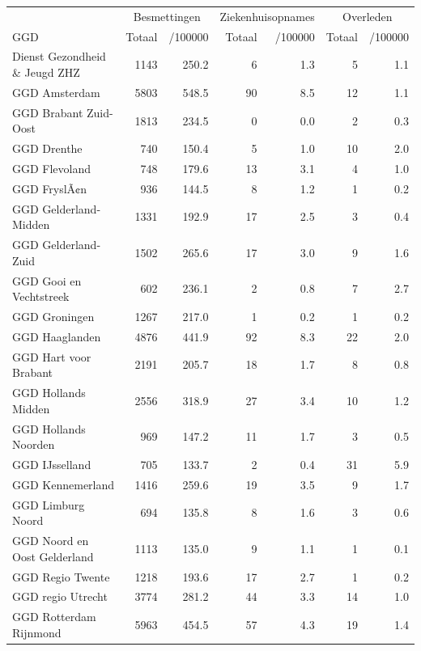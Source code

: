 \documentclass[
  english,
  man,floatsintext]{apa6}
\begin{document}
\begin{table}[H]
\centering\begingroup\fontsize{10}{12}\selectfont

\begin{threeparttable}
\begin{tabular}{lrrrrrr}
\toprule
\multicolumn{1}{c}{ } & \multicolumn{2}{c}{Besmettingen} & \multicolumn{2}{c}{Ziekenhuisopnames} & \multicolumn{2}{c}{Overleden} \\
\cmidrule(l{3pt}r{3pt}){2-3} \cmidrule(l{3pt}r{3pt}){4-5} \cmidrule(l{3pt}r{3pt}){6-7}
GGD & Totaal & /100000 & Totaal & /100000 & Totaal & /100000\\
\midrule
Dienst Gezondheid \& Jeugd ZHZ & 1143 & 250.2 & 6 & 1.3 & 5 & 1.1\\
GGD Amsterdam & 5803 & 548.5 & 90 & 8.5 & 12 & 1.1\\
GGD Brabant Zuid-Oost & 1813 & 234.5 & 0 & 0.0 & 2 & 0.3\\
GGD Drenthe & 740 & 150.4 & 5 & 1.0 & 10 & 2.0\\
GGD Flevoland & 748 & 179.6 & 13 & 3.1 & 4 & 1.0\\
GGD FryslÃ¢n & 936 & 144.5 & 8 & 1.2 & 1 & 0.2\\
GGD Gelderland-Midden & 1331 & 192.9 & 17 & 2.5 & 3 & 0.4\\
GGD Gelderland-Zuid & 1502 & 265.6 & 17 & 3.0 & 9 & 1.6\\
GGD Gooi en Vechtstreek & 602 & 236.1 & 2 & 0.8 & 7 & 2.7\\
GGD Groningen & 1267 & 217.0 & 1 & 0.2 & 1 & 0.2\\
GGD Haaglanden & 4876 & 441.9 & 92 & 8.3 & 22 & 2.0\\
GGD Hart voor Brabant & 2191 & 205.7 & 18 & 1.7 & 8 & 0.8\\
GGD Hollands Midden & 2556 & 318.9 & 27 & 3.4 & 10 & 1.2\\
GGD Hollands Noorden & 969 & 147.2 & 11 & 1.7 & 3 & 0.5\\
GGD IJsselland & 705 & 133.7 & 2 & 0.4 & 31 & 5.9\\
GGD Kennemerland & 1416 & 259.6 & 19 & 3.5 & 9 & 1.7\\
GGD Limburg Noord & 694 & 135.8 & 8 & 1.6 & 3 & 0.6\\
GGD Noord en Oost Gelderland & 1113 & 135.0 & 9 & 1.1 & 1 & 0.1\\
GGD Regio Twente & 1218 & 193.6 & 17 & 2.7 & 1 & 0.2\\
GGD regio Utrecht & 3774 & 281.2 & 44 & 3.3 & 14 & 1.0\\
GGD Rotterdam Rijnmond & 5963 & 454.5 & 57 & 4.3 & 19 & 1.4\\

\end{tabular}
\end{threeparttable}
\end{table}
\end{document}
